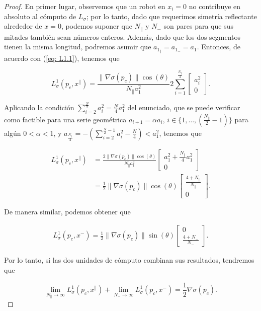 \begin{proof}
En primer lugar, observemos que un robot en $x_i = 0$ no contribuye en absoluto al cómputo de $L_{\sigma}$; por lo tanto, dado que requerimos simetría reflectante alrededor de $x = 0$, podemos suponer que $N_\parallel$ y $N_-$ son pares para que sus mitades también sean números enteros. Además, dado que los dos segmentos tienen la misma longitud, podremos asumir que $a_{1_\parallel} = a_{1_-} = a_1$. Entonces, de acuerdo con (\ref{eq: L1.1}), tenemos que

\begin{equation}
L^1_\sigma(p_c, x^\parallel) = \frac{\|\nabla\sigma(p_c)\|\cos(\theta)}{N_\parallel a_1^2} 2\sum_{i=1}^{\frac{N_\parallel}{2}}\begin{bmatrix}a_i^2 \\ 0 \end{bmatrix}.
\nonumber
\end{equation}

Aplicando la condición $\sum_{i=2}^{\frac{N}{2}}a_i^2 = \frac{N}{4}a_1^2$ del enunciado, que se puede verificar como factible para una serie geométrica $a_{i+1} = \alpha a_i, \, i \in \{1, \dots, (\frac{N_\parallel}{2}-1)\}$ para algún $0 < \alpha < 1$, y $a_{\frac{N_\parallel}{2}} = -\left(\sum_{i=2}^{\frac{N}{2}-1}a_i^2 -\frac{N}{4}\right) < a_1^2$, tenemos que

\begin{align}
L^1_\sigma(p_c, x^\parallel) &= \frac{2\|\nabla\sigma(p_c)\|\cos(\theta)}{N_\parallel a_1^2} \begin{bmatrix}a_1^2 + \frac{N_\parallel}{4}a_1^2 \\ 0\end{bmatrix} \nonumber \\
&= \frac{1}{2}\|\nabla\sigma(p_c)\|\cos(\theta) \begin{bmatrix}\frac{4 + N_\parallel}{N_\parallel} \\ 0\end{bmatrix}. \nonumber
\end{align}

De manera similar, podemos obtener que 

\begin{align}
L^1_\sigma(p_c, x^-) = \frac{1}{2}\|\nabla\sigma(p_c)\|\sin(\theta) \begin{bmatrix}0 \\ \frac{4 + N_-}{N_-}\end{bmatrix}. \nonumber
\end{align}

Por lo tanto, si las dos unidades de cómputo combinan sus resultados, tendremos que 

$$
\lim_{N_\parallel\to\infty} L^1_\sigma(p_c, x^\parallel) + \lim_{N_-\to\infty} L^1_\sigma(p_c, x^-) = \frac{1}{2}\nabla\sigma(p_c).
$$
\end{proof}

